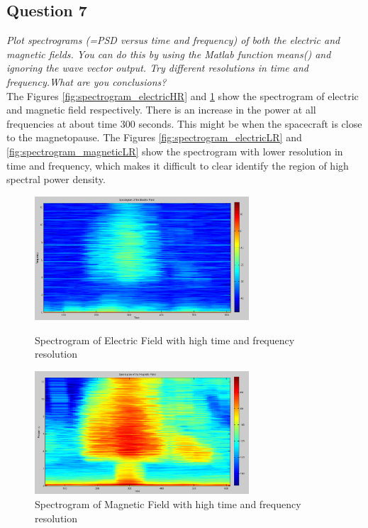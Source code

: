 \documentclass{article}
\begin{document}
\subsection{Question 7}
\textit{Plot spectrograms (=PSD versus time and frequency) of both the electric and magnetic fields. You can do this by using the Matlab function means() and ignoring the wave vector output. Try different resolutions in time and frequency.What are you conclusions?}\\

The Figures \ref{fig:spectrogram_electricHR} and \ref{fig:spectrogram_magneticHR} show the spectrogram of electric and magnetic field respectively. There is an increase in the power at all frequencies at about time 300 seconds. This might be when the spacecraft is close to the magnetopause. The Figures \ref{fig:spectrogram_electricLR} and \ref{fig:spectrogram_magneticLR} show the spectrogram with lower resolution in time and frequency, which makes it difficult to clear identify the region of high spectral power density.

\begin{figure}[htb!]
\begin{minipage}[c]{0.5\linewidth}
\centering
\includegraphics[width=8cm]{Figures/spectrogram_electricHR.png}
\caption{Spectrogram of Electric Field with high time and frequency resolution}
\label{fig:spectrogram_electricHR}
\end{minipage}
\hspace{0.1cm}
\begin{minipage}[c]{0.5\linewidth}
\centering
\includegraphics[width=8cm]{Figures/spectrogram_magneticHR.png}
\caption{Spectrogram of Magnetic Field with high time and frequency resolution}
\label{fig:spectrogram_magneticHR}
\end{minipage}
\end{figure}
\end{document}
